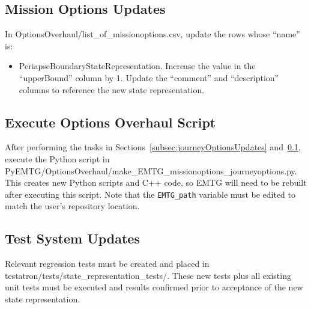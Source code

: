 \documentclass[11pt]{article}
\begin{document}
\subsection{Mission Options Updates}
\label{subsec:missionOptionsUpdates}

In OptionsOverhaul/list\_of\_missionoptions.csv, update the rows whose ``name'' is:

\begin{itemize}
	\item PeriapseBoundaryStateRepresentation. Increase the value in the ``upperBound'' column by 1. Update the ``comment'' and ``description'' columns to reference the new state representation.
\end{itemize}

\subsection{Execute Options Overhaul Script}
\label{subsec:executeOptionsOverhaulScript}

After performing the tasks in Sections~\ref{subsec:journeyOptionsUpdates} and~\ref{subsec:missionOptionsUpdates}, execute the Python script in PyEMTG/OptionsOverhaul/make\_EMTG\_missionoptions\_journeyoptions.py. This creates new Python scripts and C++ code, so EMTG will need to be rebuilt after executing this script. Note that the \texttt{EMTG\_path} variable must be edited to match the user's repository location.

\subsection{Test System Updates}
\label{subsec:testSystemUpdates}

Relevant regression tests must be created and placed in testatron/tests/state\_representation\_tests/. These new tests plus all existing unit tests must be executed and results confirmed prior to acceptance of the new state representation.


%
%
\end{document}
